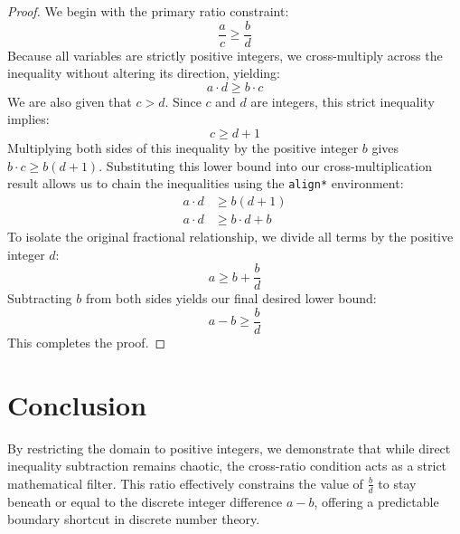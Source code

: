 \documentclass[11pt]{article}
\begin{document}
\begin{proof}
We begin with the primary ratio constraint:
\begin{equation}
\frac{a}{c} \ge \frac{b}{d}
\end{equation}
Because all variables are strictly positive integers, we cross-multiply across the inequality without altering its direction, yielding:
\begin{equation}
a \cdot d \ge b \cdot c
\end{equation}
We are also given that $c > d$. Since $c$ and $d$ are integers, this strict inequality implies:
\begin{equation}
c \ge d + 1
\end{equation}
Multiplying both sides of this inequality by the positive integer $b$ gives $b \cdot c \ge b(d + 1)$. Substituting this lower bound into our cross-multiplication result allows us to chain the inequalities using the \texttt{align*} environment:
\begin{align*}
a \cdot d &\ge b(d + 1) \\
a \cdot d &\ge b \cdot d + b
\end{align*}
To isolate the original fractional relationship, we divide all terms by the positive integer $d$:
\begin{equation}
a \ge b + \frac{b}{d}
\end{equation}
Subtracting $b$ from both sides yields our final desired lower bound:
\begin{equation}
a - b \ge \frac{b}{d}
\end{equation}
This completes the proof.
\end{proof}

\section{Conclusion}
By restricting the domain to positive integers, we demonstrate that while direct inequality subtraction remains chaotic, the cross-ratio condition acts as a strict mathematical filter. This ratio effectively constrains the value of $\frac{b}{d}$ to stay beneath or equal to the discrete integer difference $a - b$, offering a predictable boundary shortcut in discrete number theory.
\end{document}
